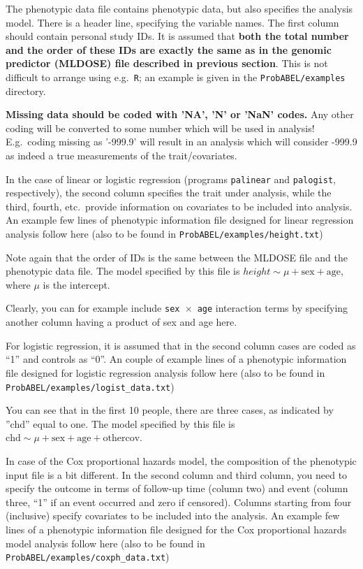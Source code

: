 \documentclass[12pt,a4paper]{article}
\begin{document}
The phenotypic data file contains phenotypic data, but also specifies the
analysis model. There is a header line, specifying the variable names.
The first column should contain personal study IDs. It is assumed
that \textbf{both the total number and the order of these IDs are
exactly the same as in the genomic predictor (MLDOSE) file described in
previous section}. This is not difficult to arrange using e.g.~\texttt{R};
an example is given in the \texttt{ProbABEL/examples} directory.

\textbf{Missing data should be coded with 'NA', 'N' or 'NaN' codes.} Any
other coding will be converted to some number which will be used in
analysis! E.g.~coding missing as '-999.9' will result in an analysis which
will consider -999.9 as indeed a true measurements of the trait/covariates.

In the case of linear or logistic regression (programs \texttt{palinear} and
\texttt{palogist}, respectively), the second column specifies the trait
under analysis, while the third, fourth, etc.~provide information on
covariates to be included into analysis.
An example few lines of phenotypic information file designed for
linear regression analysis follow here (also
to be found in \texttt{ProbABEL/examples/height.txt})



Note again that the order of IDs is the same between the MLDOSE file
and the phenotypic data file. The model specified by this file is
$height \sim \mu + \textrm{sex} + \textrm{age}$, where $\mu$ is the intercept.

Clearly, you can for example include \texttt{sex $\times$ age} interaction terms by
specifying another column having a product of sex and age here.

For logistic regression, it is assumed that in the second column cases are
coded as ``1'' and controls as ``0''. An couple of example lines of a phenotypic
information file designed for logistic regression analysis follow here (also
to be found in \texttt{ProbABEL/examples/logist\_data.txt})



You can see that in the first 10 people, there are three cases, as indicated
by ''chd'' equal to one. The model specified by this file
is $\textrm{chd} \sim \mu + \textrm{sex} + \textrm{age} + \textrm{othercov}$.

In case of the Cox proportional hazards model, the composition of the
phenotypic input file is a bit different. In the second column and
third column, you need to specify the outcome in terms of follow-up
time (column two) and event (column three, ``1'' if an event occurred
and zero if censored). Columns starting from four (inclusive) specify
covariates to be included into the analysis. An example few lines of
a phenotypic information file designed for the Cox proportional hazards model
analysis follow here (also to be found in
\texttt{ProbABEL/examples/coxph\_data.txt})
\end{document}
